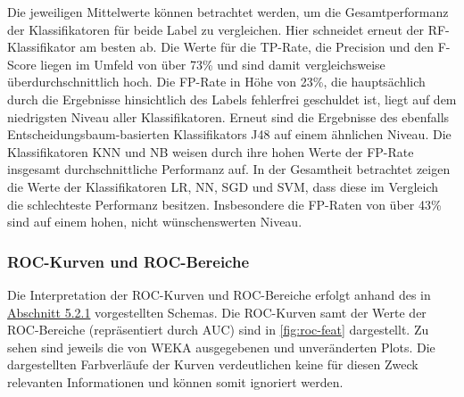 Die jeweiligen Mittelwerte können betrachtet werden, um die Gesamtperformanz der Klassifikatoren für beide Label zu vergleichen. Hier schneidet erneut der RF-Klassifikator am besten ab. Die Werte für die TP-Rate, die Precision und den F-Score liegen im Umfeld von über 73\% und sind damit vergleichsweise überdurchschnittlich hoch. Die FP-Rate in Höhe von 23\%, die hauptsächlich durch die Ergebnisse hinsichtlich des Labels \glqq fehlerfrei\grqq{} geschuldet ist, liegt auf dem niedrigsten Niveau aller Klassifikatoren. Erneut sind die Ergebnisse des ebenfalls Entscheidungsbaum-basierten Klassifikators J48 auf einem ähnlichen Niveau. Die Klassifikatoren KNN und NB weisen durch ihre hohen Werte der FP-Rate insgesamt durchschnittliche Performanz auf. In der Gesamtheit betrachtet zeigen die Werte der Klassifikatoren LR, NN, SGD und SVM, dass diese im Vergleich die schlechteste Performanz besitzen. Insbesondere die FP-Raten von über 43\% sind auf einem hohen, nicht wünschenswerten Niveau. 

\subsubsection*{ROC-Kurven und ROC-Bereiche}

Die Interpretation der ROC-Kurven und ROC-Bereiche erfolgt anhand des in \hyperref[roc-def]{Abschnitt 5.2.1} vorgestellten Schemas. Die ROC-Kurven samt der Werte der ROC-Bereiche (repräsentiert durch \glqq AUC\grqq{}) sind in \autoref{fig:roc-feat}  dargestellt. Zu sehen sind jeweils die von WEKA ausgegebenen und unveränderten Plots. Die dargestellten Farbverläufe der Kurven verdeutlichen keine für diesen Zweck relevanten Informationen und können somit ignoriert werden.

